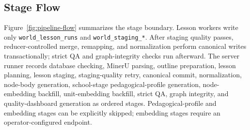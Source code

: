 \documentclass[11pt,letterpaper]{article}
\newcommand{\code}[1]{\nolinkurl{#1}}
\begin{document}
\subsection{Stage Flow}

Figure~\ref{fig:pipeline-flow} summarizes the stage boundary. Lesson workers write only \code{world_lesson_runs} and \code{world_staging_*}. After staging quality passes, reducer-controlled merge, remapping, and normalization perform canonical writes transactionally; strict QA and graph-integrity checks run afterward. The server runner records database checking, MinerU parsing, outline preparation, lesson planning, lesson staging, staging-quality retry, canonical commit, normalization, node-body generation, school-stage pedagogical-profile generation, node-embedding backfill, unit-embedding backfill, strict QA, graph integrity, and quality-dashboard generation as ordered stages. Pedagogical-profile and embedding stages can be explicitly skipped; embedding stages require an operator-configured endpoint.
\end{document}
